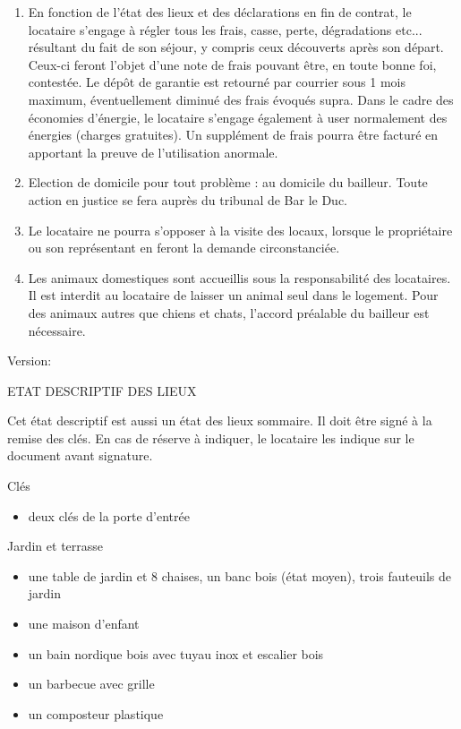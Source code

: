 \documentclass[a4paper,11pt]{article}
\begin{document}
\begin{enumerate}
\item En fonction de l’état des lieux et des déclarations en fin de contrat, le locataire s’engage à régler tous les frais, casse, perte, dégradations etc... résultant du fait de son séjour, y compris ceux découverts après son départ.
Ceux-ci feront l'objet d'une note de frais pouvant être, en toute bonne foi, contestée. 
Le dépôt de garantie est retourné par courrier sous 1 mois maximum, éventuellement diminué des frais évoqués supra.
Dans le cadre des économies d’énergie, le locataire s’engage également à user normalement des énergies (charges gratuites).
Un supplément de frais pourra être facturé en apportant la preuve de l’utilisation anormale.

\item Election de domicile pour tout problème : au domicile du bailleur. Toute action en justice se fera auprès du tribunal de Bar le Duc.

\item Le locataire ne pourra s’opposer à la visite des locaux, lorsque le propriétaire ou son représentant en feront la demande circonstanciée.

\item Les animaux domestiques sont accueillis sous la responsabilité des locataires. Il est interdit au locataire de laisser un animal seul dans le logement. Pour des animaux autres que chiens et chats, l'accord préalable du bailleur est nécessaire.

\end{enumerate}

\hspace{10cm}
Version: \date{\today}


\normalsize

\newpage{}

ETAT DESCRIPTIF DES LIEUX
 
Cet état descriptif est aussi un état des lieux sommaire. Il doit être signé à la remise des clés. En cas de réserve à indiquer, le locataire les indique sur le document avant signature.

\vspace{0.25cm}


Clés
\begin{itemize}
\item deux clés de la porte d'entrée
\end{itemize}


\vspace{0.25cm}

Jardin et terrasse
\begin{itemize}
\item une table de jardin et 8 chaises, un banc bois (état moyen), trois fauteuils de jardin
\item une maison d'enfant
\item un bain nordique bois avec tuyau inox et escalier bois
\item un barbecue avec grille
\item un composteur plastique
\end{itemize}
\end{document}
